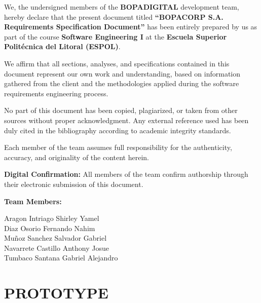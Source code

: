 \documentclass[letterpaper%
, oneside%
, 12pt%
, memoireprojet%
, english%
,creativecommons,hyperref, withAlgo2e %
]{thETS}
\begin{document}
We, the undersigned members of the \textbf{BOPADIGITAL} development team, hereby declare that the present document titled \textbf{“BOPACORP S.A. Requirements Specification Document”} has been entirely prepared by us as part of the course \textbf{Software Engineering I} at the \textbf{Escuela Superior Politécnica del Litoral (ESPOL)}.

We affirm that all sections, analyses, and specifications contained in this document represent our own work and understanding, based on information gathered from the client and the methodologies applied during the software requirements engineering process.  

No part of this document has been copied, plagiarized, or taken from other sources without proper acknowledgment. Any external reference used has been duly cited in the bibliography according to academic integrity standards.

Each member of the team assumes full responsibility for the authenticity, accuracy, and originality of the content herein.

\vspace{1cm}

\noindent\textbf{Digital Confirmation:} All members of the team confirm authorship through their electronic submission of this document.

\vspace{1cm}

\noindent\textbf{Team Members:}

\vspace{0.3cm}
\noindent Aragon Intriago Shirley Yamel \\
Diaz Osorio Fernando Nahim \\
Muñoz Sanchez Salvador Gabriel \\
Navarrete Castillo Anthony Josue \\
Tumbaco Santana Gabriel Alejandro






\appendix

\multiannexe

% 
\captionsetup[figure]{list=yes}

\chapter{PROTOTYPE}
\end{document}
